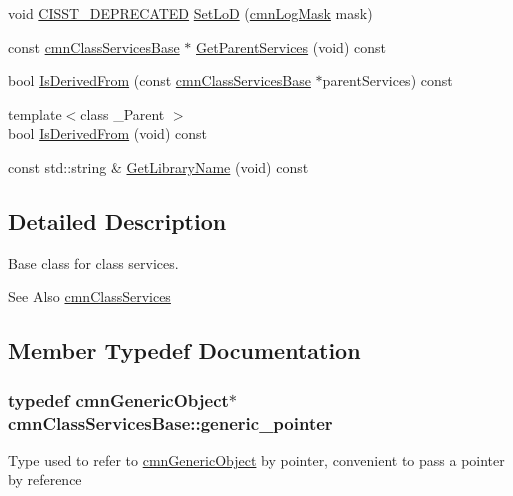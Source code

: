 \begin{DoxyCompactItemize}
\item 
void \hyperlink{cmn_portability_8h_a63da7164735f9501be651b1f2bbc0121}{C\-I\-S\-S\-T\-\_\-\-D\-E\-P\-R\-E\-C\-A\-T\-E\-D} \hyperlink{classcmn_class_services_base_a0e5f1d9711b8a133d6a22b6043b5d8e3}{Set\-Lo\-D} (\hyperlink{cmn_log_lo_d_8h_a44b6ef7560b0d204460b0a54f1a5d702}{cmn\-Log\-Mask} mask)
\item 
const \hyperlink{classcmn_class_services_base}{cmn\-Class\-Services\-Base} $\ast$ \hyperlink{classcmn_class_services_base_a410b9a18f1f2f2dbebaf4171be08ea21}{Get\-Parent\-Services} (void) const 
\item 
bool \hyperlink{classcmn_class_services_base_aa83c6816e89ab34c491846a9412900ce}{Is\-Derived\-From} (const \hyperlink{classcmn_class_services_base}{cmn\-Class\-Services\-Base} $\ast$parent\-Services) const 
\item 
{\footnotesize template$<$class \-\_\-\-Parent $>$ }\\bool \hyperlink{classcmn_class_services_base_ae916d7288df4e83c4fc0e85a25ff2404}{Is\-Derived\-From} (void) const 
\item 
const std\-::string \& \hyperlink{classcmn_class_services_base_a7d253ca610d74b50b7196eba96208fd8}{Get\-Library\-Name} (void) const 
\end{DoxyCompactItemize}


\subsection{Detailed Description}
Base class for class services. 

\begin{DoxySeeAlso}{See Also}
\hyperlink{classcmn_class_services}{cmn\-Class\-Services} 
\end{DoxySeeAlso}


\subsection{Member Typedef Documentation}
\hypertarget{classcmn_class_services_base_a859cb10b40a79b083c9ba0cae0d52afd}{
\subsubsection[{generic\-\_\-pointer}]{\setlength{\rightskip}{0pt plus 5cm}typedef {\bf cmn\-Generic\-Object}$\ast$ {\bf cmn\-Class\-Services\-Base\-::generic\-\_\-pointer}}}\label{classcmn_class_services_base_a859cb10b40a79b083c9ba0cae0d52afd}
Type used to refer to \hyperlink{classcmn_generic_object}{cmn\-Generic\-Object} by pointer, convenient to pass a pointer by reference 

